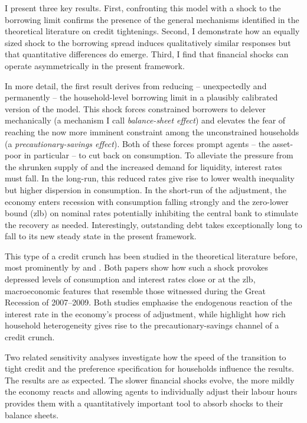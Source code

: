 \documentclass[a4paper,12pt]{article} %
\numberwithin{equation}{section} %
\numberwithin{figure}{section}
\numberwithin{table}{section}
\begin{document}
I present three key results. First, confronting this model with a shock to the borrowing limit confirms the presence of the general mechanisms identified in the theoretical literature on credit tightenings. Second, I demonstrate how an equally sized shock to the borrowing spread induces qualitatively similar responses but that quantitative differences do emerge. Third, I find that financial shocks can operate asymmetrically in the present framework.

In more detail, the first result derives from reducing -- unexpectedly and permanently -- the household-level borrowing limit in a plausibly calibrated version of the model. This shock forces constrained borrowers to delever mechanically (a mechanism I call \textit{balance-sheet effect}) and elevates the fear of reaching the now more imminent constraint among the unconstrained households (a \textit{precautionary-savings effect}). Both of these forces prompt agents -- the asset-poor in particular -- to cut back on consumption. To alleviate the pressure from the shrunken supply of and the increased demand for liquidity, interest rates must fall. In the long-run, this reduced rates give rise to lower wealth inequality but higher dispersion in consumption. In the short-run of the adjustment, the economy enters recession with consumption falling strongly and the zero-lower bound (\Gls{zlb}) on nominal rates potentially inhibiting the central bank to stimulate the recovery as needed. Interestingly, outstanding debt takes exceptionally long to fall to its new steady state in the present framework.

This type of a credit crunch has been studied in the theoretical literature before, most prominently by \textcite{egg2012} and \textcite{gl2017}. Both papers show how such a shock provokes depressed levels of consumption and interest rates close or at the \Gls{zlb}, macroeconomic features that resemble those witnessed during the Great Recession of 2007--2009. Both studies emphasise the endogenous reaction of the interest rate in the economy's process of adjustment, while \textcite{gl2017} highlight how rich household heterogeneity gives rise to the precautionary-savings channel of a credit crunch.

Two related sensitivity analyses investigate how the speed of the transition to tight credit and the preference specification for households influence the results. The results are as expected. The slower financial shocks evolve, the more mildly the economy reacts and allowing agents to individually adjust their labour hours provides them with a quantitatively important tool to absorb shocks to their balance sheets.
\end{document}
